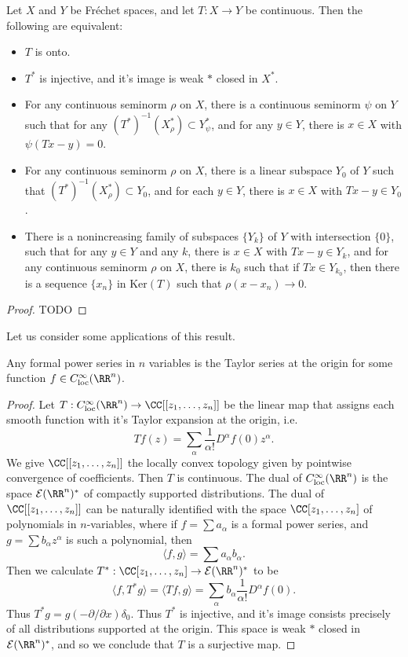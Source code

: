 \begin{theorem}
    Let $X$ and $Y$ be Fr\'{e}chet spaces, and let $T: X \to Y$ be continuous. Then the following are equivalent:
    \begin{itemize}
        \item $T$ is onto.
        \item $T^*$ is injective, and it's image is weak $*$ closed in $X^*$.
        \item For any continuous seminorm $\rho$ on $X$, there is a continuous seminorm $\psi$ on $Y$ such that for any $(T^*)^{-1}(X^*_\rho) \subset Y^*_\psi$, and for any $y \in Y$, there is $x \in X$ with $\psi(Tx - y) = 0$.
        \item For any continuous seminorm $\rho$ on $X$, there is a linear subspace $Y_0$ of $Y$ such that $(T^*)^{-1}(X^*_\rho) \subset Y_0$, and for each $y \in Y$, there is $x \in X$ with $Tx - y \in Y_0$.
        \item There is a nonincreasing family of subspaces $\{ Y_k \}$ of $Y$ with intersection $\{ 0 \}$, such that for any $y \in Y$ and any $k$, there is $x \in X$ with $Tx - y \in Y_k$, and for any continuous seminorm $\rho$ on $X$, there is $k_0$ such that if $Tx \in Y_{k_0}$, then there is a sequence $\{ x_n \}$ in $\text{Ker}(T)$ such that $\rho(x - x_n) \to 0$.
    \end{itemize}
\end{theorem}
\begin{proof}
    TODO
\end{proof}

Let us consider some applications of this result.

\begin{theorem}
    Any formal power series in $n$ variables is the Taylor series at the origin for some function $f \in C^\infty_{\text{loc}}(\RR^n)$.
\end{theorem}
\begin{proof}
    Let $T: C^\infty_{\text{loc}}(\RR^n) \to \CC[[z_1,\dots,z_n]]$ be the linear map that assigns each smooth function with it's Taylor expansion at the origin, i.e.
    \[ Tf(z) = \sum_\alpha \frac{1}{\alpha!} D^\alpha f(0) z^\alpha. \]
    We give $\CC[[z_1,\dots,z_n]]$ the locally convex topology given by pointwise convergence of coefficients. Then $T$ is continuous. The dual of $C^\infty_{\text{loc}}(\RR^n)$ is the space $\mathcal{E}(\RR^n)^*$ of compactly supported distributions. The dual of $\CC[[z_1,\dots,z_n]]$ can be naturally identified with the space $\CC[z_1,\dots,z_n]$ of polynomials in $n$-variables, where if $f = \sum a_\alpha$ is a formal power series, and $g = \sum b_\alpha z^\alpha$ is such a polynomial, then
    \[ \langle f, g \rangle = \sum a_\alpha b_\alpha. \]
    Then we calculate $T^*: \CC[z_1,\dots,z_n] \to \mathcal{E}(\RR^n)^*$ to be
    \[ \langle f, T^* g \rangle = \langle Tf, g \rangle = \sum_\alpha b_\alpha \frac{1}{\alpha!} D^\alpha f(0). \]
    Thus $T^*g = g(-\partial / \partial x) \delta_0$. Thus $T^*$ is injective, and it's image consists precisely of all distributions supported at the origin. This space is weak $*$ closed in $\mathcal{E}(\RR^n)^*$, and so we conclude that $T$ is a surjective map.
\end{proof}

